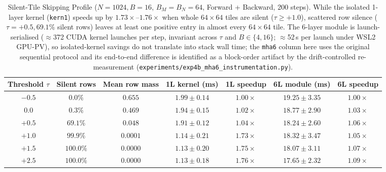\documentclass[11pt,a4paper]{article}
\begin{document}
\begin{table}[ht!]
\centering
\caption{Silent-Tile Skipping Profile ($N=1024, B=16$, $B_M=B_N=64$, Forward + Backward, 200 steps). While the isolated 1-layer kernel (\texttt{kern1}) speeds up by $1.73\times$--$1.76\times$ when whole $64\times 64$ tiles are silent ($\tau \ge +1.0$), scattered row silence ($\tau=+0.5, 69.1\%$ silent rows) leaves at least one positive entry in almost every $64\times 64$ tile. The 6-layer module is launch-serialised ($\approx$372 CUDA kernel launches per step, invariant across $\tau$ and $B \in \{4,16\}$; $\approx$52\,\textmu s per launch under WSL2 GPU-PV), so isolated-kernel savings do not translate into stack wall time; the \texttt{mha6} column here uses the original sequential protocol and its end-to-end difference is identified as a block-order artifact by the drift-controlled re-measurement (\texttt{experiments/exp4b\_mha6\_instrumentation.py}).}
\label{tab:exp4_skip}
\scriptsize
\setlength{\tabcolsep}{2.0pt}
\begin{tabular}{ccccccc}
\toprule
Threshold $\tau$ & Silent rows & Mean row mass & 1L kernel (ms) & 1L speedup & 6L module (ms) & 6L speedup \\
\midrule
$-0.5$ & $0.0\%$ & $0.655$ & $1.99 \pm 0.14$ & $1.00\times$ & $19.25 \pm 3.35$ & $1.00\times$ \\
$0.0$ & $0.3\%$ & $0.469$ & $1.94 \pm 0.15$ & $1.02\times$ & $18.77 \pm 2.90$ & $1.03\times$ \\
$+0.5$ & $69.1\%$ & $0.048$ & $1.91 \pm 0.12$ & $1.04\times$ & $18.24 \pm 2.60$ & $1.06\times$ \\
$+1.0$ & $99.9\%$ & $0.0001$ & $\mathbf{1.14 \pm 0.21}$ & $\mathbf{1.73\times}$ & $18.32 \pm 3.47$ & $1.05\times$ \\
$+1.5$ & $100.0\%$ & $0.0000$ & $\mathbf{1.13 \pm 0.20}$ & $\mathbf{1.75\times}$ & $18.07 \pm 3.11$ & $1.07\times$ \\
$+2.5$ & $100.0\%$ & $0.0000$ & $\mathbf{1.13 \pm 0.18}$ & $\mathbf{1.76\times}$ & $17.65 \pm 2.32$ & $1.09\times$ \\
\bottomrule
\end{tabular}
\end{table}
\end{document}
